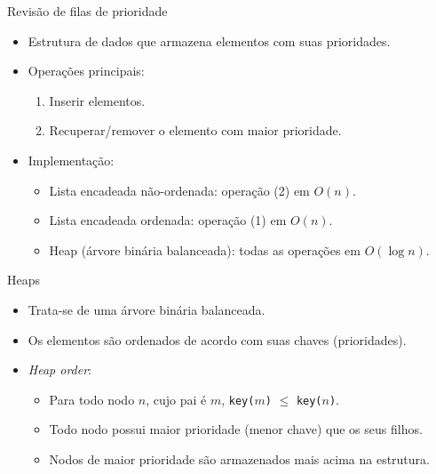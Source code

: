 \begin{frame}{Revisão de filas de prioridade}
	\begin{itemize}
		\item Estrutura de dados que armazena elementos com suas prioridades.
		\item Operações principais:
		\begin{enumerate}
			\item Inserir elementos.
			\item Recuperar/remover o elemento com maior prioridade.
		\end{enumerate}
	\item Implementação:
	\begin{itemize}
		\item Lista encadeada não-ordenada: operação (2) em $O(n)$.
		\item Lista encadeada ordenada: operação (1) em $O(n)$.
		\item Heap (árvore binária balanceada): todas as operações em $O(\log n)$.
	\end{itemize}
	\end{itemize}
\end{frame}



\begin{frame}{Heaps}
\begin{itemize}
	\item Trata-se de uma árvore binária balanceada.
	\item Os elementos são ordenados de acordo com suas chaves (prioridades).
	\item \textit{Heap order}:
	\begin{itemize}
		\item Para todo nodo $n$, cujo pai é $m$, \texttt{key($m$)} $\le$ \texttt{key($n$)}.
		\item Todo nodo possui maior prioridade (menor chave) que os seus filhos.
		\item Nodos de maior prioridade são armazenados mais acima na estrutura.
	\end{itemize}
\end{itemize}

\begin{figure}
	
\end{figure}
\end{frame}



